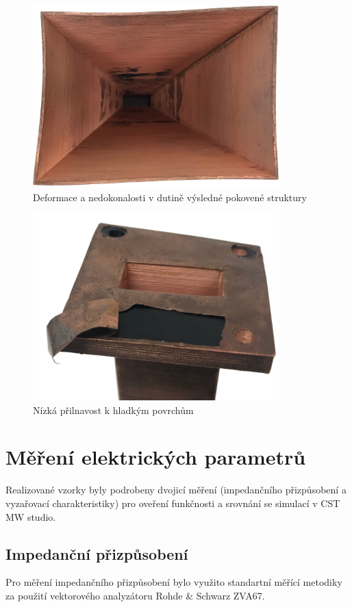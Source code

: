 \begin{figure}[!htbp]
\begin{center}
\includegraphics[width=9.5cm]{pics/plated/deform}
\caption{Deformace a nedokonalosti v dutině výsledné pokovené struktury}
\label{fig:PLdef}
\end{center}
\end{figure}

\begin{figure}[!htbp]
\begin{center}
\includegraphics[width=9.5cm]{pics/plated/adhes}
\caption{Nízká přilnavost k hladkým povrchům}
\label{fig:PLadh}
\end{center}
\end{figure}


\section{Měření elektrických parametrů}
Realizované vzorky byly podrobeny dvojicí měření (impedančního přizpůsobení a vyzařovací charakteristiky) pro oveření funkčnosti a srovnání se simulací v CST MW studio.

\subsection{Impedanční přizpůsobení}
Pro měření impedančního přizpůsobení bylo využito standartní měřící metodiky za použití vektorového analyzátoru Rohde \& Schwarz ZVA67.

